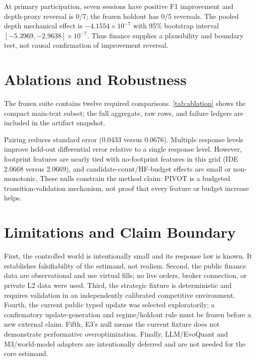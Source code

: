 \documentclass{article} %
\begin{document}
At primary participation, seven sessions have positive F1 improvement and
depth-proxy reversal is 0/7; the frozen holdout has 0/5 reversals. The pooled
depth mechanical effect is $-4.1554\times10^{-7}$ with 95\% bootstrap interval
$[-5.3969,-2.9638]\times10^{-7}$. Thus finance supplies a plausibility and
boundary test, not causal confirmation of improvement reversal.

\section{Ablations and Robustness}
The frozen suite contains twelve required comparisons. \cref{tab:ablation}
shows the compact main-text subset; the full aggregate, raw rows, and failure
ledgers are included in the artifact snapshot.

\begin{table}[t]
\centering\scriptsize
\caption{Selected controlled ablations. Values are descriptive estimates over
three independent registered runs; slash-separated values compare variants.}
\label{tab:ablation}
\resizebox{\linewidth}{!}{}
\end{table}

Pairing reduces standard error (0.0433 versus 0.0676). Multiple response levels
improve held-out differential error relative to a single response level.
However, footprint features are nearly tied with no-footprint features in this
grid (IDE 2.0668 versus 2.0669), and candidate-count/HF-budget effects are
small or non-monotonic. These nulls constrain the method claim: PIVOT is a
budgeted transition-validation mechanism, not proof that every feature or
budget increase helps.

\section{Limitations and Claim Boundary}
First, the controlled world is intentionally small and its response law is
known. It establishes falsifiability of the estimand, not realism. Second, the
public finance data are observational and use virtual fills; no live orders,
broker connection, or private L2 data were used. Third, the strategic fixture
is deterministic and requires validation in an independently calibrated
competitive environment. Fourth, the current public typed update was selected
exploratorily; a confirmatory update-generation and regime/holdout rule must be
frozen before a new external claim. Fifth, E3's null means the current fixture
does not demonstrate performative overoptimization. Finally, LLM/EvoQuant and
M3/world-model adapters are intentionally deferred and are not needed for the
core estimand.
\end{document}
